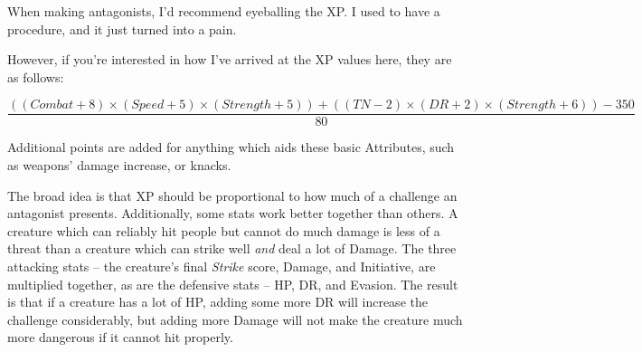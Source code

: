 \begin{multicols}{2}

When making antagonists, I'd recommend eyeballing the XP.  I used to have a procedure, and it just turned into a pain.

However, if you're interested in how I've arrived at the XP values here, they are as follows:

\end{multicols}

\begin{equation}
\frac{(( Combat + 8 ) \times ( Speed + 5) \times ( Strength + 5 ) ) + ( ( TN -2 ) \times ( DR + 2 ) \times ( Strength + 6 )) - 350}{80}
\end{equation}

\begin{multicols}{2}

Additional points are added for anything which aids these basic Attributes, such as weapons' damage increase, or knacks.

\label{lastpage}The broad idea is that XP should be proportional to how much of a challenge an antagonist presents.  Additionally, some stats work better together than others.  A creature which can reliably hit people but cannot do much damage is less of a threat than a creature which can strike well \emph{and} deal a lot of Damage.  The three attacking stats -- the creature's final \textit{Strike} score, Damage, and Initiative, are multiplied together, as are the defensive stats -- HP, DR, and Evasion.  The result is that if a creature has a lot of HP, adding some more DR will increase the challenge considerably, but adding more Damage will not make the creature much more dangerous if it cannot hit properly.

\end{multicols}

